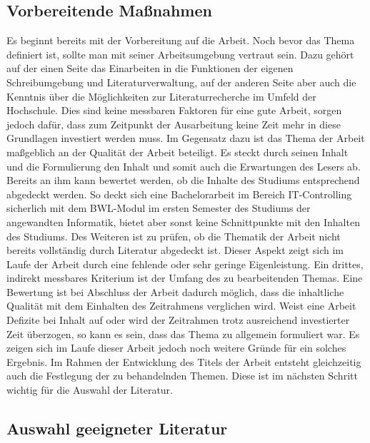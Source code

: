 \subsection{Vorbereitende Maßnahmen}
Es beginnt bereits mit der Vorbereitung auf die Arbeit. Noch bevor das Thema definiert ist, sollte man mit seiner Arbeitsumgebung vertraut sein. Dazu gehört auf der einen Seite das Einarbeiten in die Funktionen der eigenen Schreibumgebung und Literaturverwaltung, auf der anderen Seite aber auch die Kenntnis über die Möglichkeiten zur Literaturrecherche im Umfeld der Hochschule.\cite[Vgl.][S. 43]{Baensch:2013} Dies sind keine messbaren Faktoren für eine gute Arbeit, sorgen jedoch dafür, dass zum Zeitpunkt der Ausarbeitung keine Zeit mehr in diese Grundlagen investiert werden muss.
Im Gegensatz dazu ist das Thema der Arbeit maßgeblich an der Qualität der Arbeit beteiligt. Es steckt durch seinen Inhalt und die Formulierung den Inhalt und somit auch die Erwartungen des Lesers ab. Bereits an ihm kann bewertet werden, ob die Inhalte des Studiums entsprechend abgedeckt werden. So deckt sich eine Bachelorarbeit im Bereich IT-Controlling sicherlich mit dem BWL-Modul im ersten Semester des Studiums der angewandten Informatik, bietet aber sonst keine Schnittpunkte mit den Inhalten des Studiums. Des Weiteren ist zu prüfen, ob die Thematik der Arbeit nicht bereits vollständig durch Literatur abgedeckt ist. Dieser Aspekt zeigt sich im Laufe der Arbeit durch eine fehlende oder sehr geringe Eigenleistung. Ein drittes, indirekt messbares Kriterium ist der Umfang des zu bearbeitenden Themas. Eine Bewertung ist bei Abschluss der Arbeit dadurch möglich, dass die inhaltliche Qualität mit dem Einhalten des Zeitrahmens verglichen wird. Weist eine Arbeit Defizite bei Inhalt auf oder wird der Zeitrahmen trotz ausreichend investierter Zeit überzogen, so kann es sein, dass das Thema zu allgemein formuliert war.\cite[Vgl.][S. 46 f.]{Baensch:2013} Es zeigen sich im Laufe dieser Arbeit jedoch noch weitere Gründe für ein solches Ergebnis.
Im Rahmen der Entwicklung des Titels der Arbeit entsteht gleichzeitig auch die Festlegung der zu behandelnden Themen. Diese ist im nächsten Schritt wichtig für die Auswahl der Literatur.

\subsection{Auswahl geeigneter Literatur}

